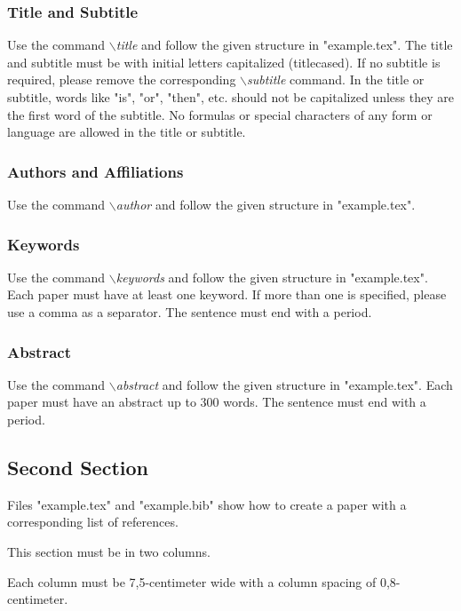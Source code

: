 \documentclass[a4paper,twoside]{article}
\begin{document}
\vfill
\subsubsection{Title and Subtitle}

Use the command \textit{$\backslash$title} and follow the given structure in "example.tex". The title and subtitle must be with initial letters
capitalized (titlecased). If no subtitle is required, please remove the corresponding \textit{$\backslash$subtitle} command. In the title or subtitle, words like "is", "or", "then", etc. should not be capitalized unless they are the first word of the subtitle. No formulas or special characters of any form or language are allowed in the title or subtitle.

\subsubsection{Authors and Affiliations}

Use the command \textit{$\backslash$author} and follow the given structure in "example.tex".

\subsubsection{Keywords}

Use the command \textit{$\backslash$keywords} and follow the given structure in "example.tex". Each paper must have at least one keyword. If more than one is specified, please use a comma as a separator. The sentence must end with a period.

\subsubsection{Abstract}

Use the command \textit{$\backslash$abstract} and follow the given structure in "example.tex".
Each paper must have an abstract up to 300 words. The sentence
must end with a period.

\subsection{Second Section}

Files "example.tex" and "example.bib" show how to create a paper
with a corresponding list of references.

This section must be in two columns.

Each column must be 7,5-centimeter wide with a column spacing
of 0,8-centimeter.
\end{document}
